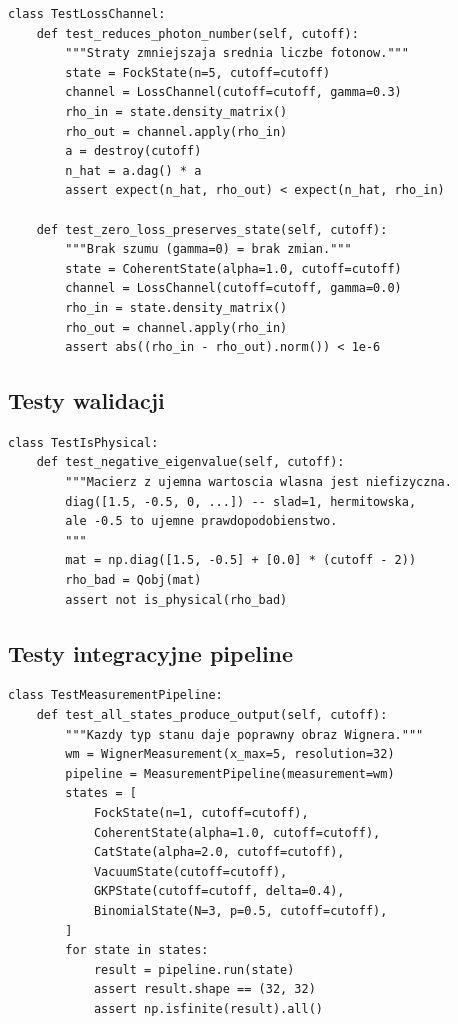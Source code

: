 \documentclass[12pt,a4paper]{article}
\begin{document}
\begin{lstlisting}[caption={Testy kanałów szumu --- przykłady.}, label={lst:test-noise}]
class TestLossChannel:
    def test_reduces_photon_number(self, cutoff):
        """Straty zmniejszaja srednia liczbe fotonow."""
        state = FockState(n=5, cutoff=cutoff)
        channel = LossChannel(cutoff=cutoff, gamma=0.3)
        rho_in = state.density_matrix()
        rho_out = channel.apply(rho_in)
        a = destroy(cutoff)
        n_hat = a.dag() * a
        assert expect(n_hat, rho_out) < expect(n_hat, rho_in)

    def test_zero_loss_preserves_state(self, cutoff):
        """Brak szumu (gamma=0) = brak zmian."""
        state = CoherentState(alpha=1.0, cutoff=cutoff)
        channel = LossChannel(cutoff=cutoff, gamma=0.0)
        rho_in = state.density_matrix()
        rho_out = channel.apply(rho_in)
        assert abs((rho_in - rho_out).norm()) < 1e-6
\end{lstlisting}

\subsection{Testy walidacji}

\begin{lstlisting}[caption={Testy funkcji \texttt{is\_physical()} --- wykrywanie macierzy niefizycznych.}, label={lst:test-validation}]
class TestIsPhysical:
    def test_negative_eigenvalue(self, cutoff):
        """Macierz z ujemna wartoscia wlasna jest niefizyczna.
        diag([1.5, -0.5, 0, ...]) -- slad=1, hermitowska,
        ale -0.5 to ujemne prawdopodobienstwo.
        """
        mat = np.diag([1.5, -0.5] + [0.0] * (cutoff - 2))
        rho_bad = Qobj(mat)
        assert not is_physical(rho_bad)
\end{lstlisting}

\subsection{Testy integracyjne pipeline}

\begin{lstlisting}[caption={Test integracyjny: wszystkie stany przez pipeline.}, label={lst:test-pipeline}]
class TestMeasurementPipeline:
    def test_all_states_produce_output(self, cutoff):
        """Kazdy typ stanu daje poprawny obraz Wignera."""
        wm = WignerMeasurement(x_max=5, resolution=32)
        pipeline = MeasurementPipeline(measurement=wm)
        states = [
            FockState(n=1, cutoff=cutoff),
            CoherentState(alpha=1.0, cutoff=cutoff),
            CatState(alpha=2.0, cutoff=cutoff),
            VacuumState(cutoff=cutoff),
            GKPState(cutoff=cutoff, delta=0.4),
            BinomialState(N=3, p=0.5, cutoff=cutoff),
        ]
        for state in states:
            result = pipeline.run(state)
            assert result.shape == (32, 32)
            assert np.isfinite(result).all()
\end{lstlisting}
\end{document}
